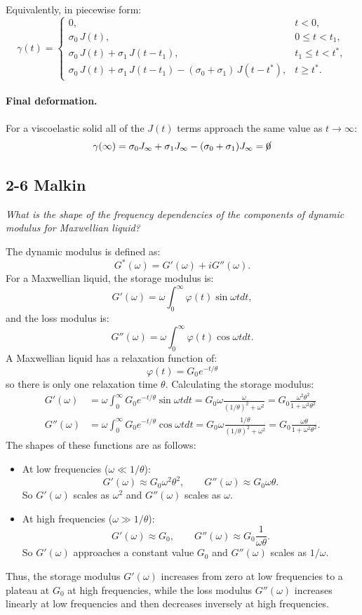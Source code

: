 Equivalently, in piecewise form:
\[
\gamma(t)=
\begin{cases}
0, & t<0,\\[4pt]
\sigma_0\,J(t), & 0\le t<t_1,\\[4pt]
\sigma_0\,J(t)+\sigma_1\,J(t-t_1), & t_1\le t<t^*,\\[4pt]
\sigma_0\,J(t)+\sigma_1\,J(t-t_1)-(\sigma_0+\sigma_1)\,J(t-t^*), & t\ge t^*.
\end{cases}
\]

\paragraph{Final deformation.}
For a viscoelastic solid all of the $J(t)$ terms approach the same value as $t\to\infty$:
\[
\gamma(\infty)
=\sigma_0J_\infty+\sigma_1J_\infty-(\sigma_0+\sigma_1)J_\infty = \cancel{0}
\]


\subsection{2-6 Malkin}
\textit{What is the shape of the frequency dependencies of the components of dynamic modulus for Maxwellian liquid?}

The dynamic modulus is defined as:
\[
	G^*(\omega) = G'(\omega) + i G''(\omega).
\]
For a Maxwellian liquid, the storage modulus is:
\[
	G'(\omega) = \omega \int_0^\infty \varphi(t) \sin\omega t dt,
\]
and the loss modulus is:
\[
	G''(\omega) = \omega \int_0^\infty \varphi(t) \cos\omega t dt.
\]
A Maxwellian liquid has a relaxation function of:
\[
	\varphi(t) = G_0 e^{-t/\theta}
\]
so there is only one relaxation time $\theta$.
Calculating the storage modulus:
\begin{align*}
	G'(\omega)
	&= \omega \int_0^\infty G_0 e^{-t/\theta} \sin\omega t dt 
	= G_0 \omega \frac{\omega}{(1/\theta)^2 + \omega^2} 
	= G_0 \frac{\omega^2 \theta^2}{1 + \omega^2 \theta^2}\\
	G''(\omega)
	&= \omega \int_0^\infty G_0 e^{-t/\theta} \cos\omega t dt 
	= G_0 \omega \frac{1/\theta}{(1/\theta)^2 + \omega^2} 
	= G_0 \frac{\omega \theta}{1 + \omega^2 \theta^2}.
\end{align*}
The shapes of these functions are as follows:
\begin{itemize}
	\item At low frequencies ($\omega \ll 1/\theta$):
	\[
		G'(\omega) \approx G_0 \omega^2 \theta^2,
		\qquad
		G''(\omega) \approx G_0 \omega \theta.
	\]
	So $G'(\omega)$ scales as $\omega^2$ and $G''(\omega)$ scales as $\omega$.
	\item At high frequencies ($\omega \gg 1/\theta$):
	\[
		G'(\omega) \approx G_0,
		\qquad
		G''(\omega) \approx G_0 \frac{1}{\omega \theta}.
	\]
	So $G'(\omega)$ approaches a constant value $G_0$ and $G''(\omega)$ scales as $1/\omega$.
\end{itemize}
Thus, the storage modulus $G'(\omega)$ increases from zero at low frequencies to a plateau at $G_0$ at high frequencies, while the loss modulus $G''(\omega)$ increases linearly at low frequencies and then decreases inversely at high frequencies.


